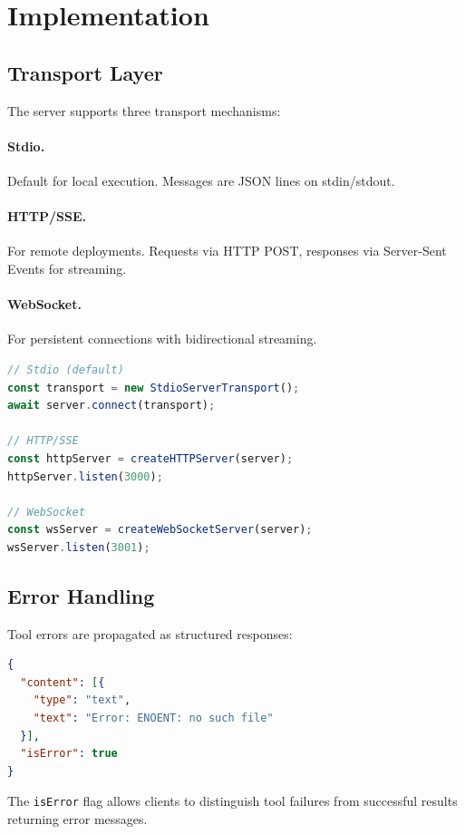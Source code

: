 \section{Implementation}


\subsection{Transport Layer}

The server supports three transport mechanisms:

\paragraph{Stdio.} Default for local execution. Messages are JSON lines on stdin/stdout.

\paragraph{HTTP/SSE.} For remote deployments. Requests via HTTP POST, responses via Server-Sent Events for streaming.

\paragraph{WebSocket.} For persistent connections with bidirectional streaming.

\begin{lstlisting}[language=TypeScript]
// Stdio (default)
const transport = new StdioServerTransport();
await server.connect(transport);

// HTTP/SSE
const httpServer = createHTTPServer(server);
httpServer.listen(3000);

// WebSocket
const wsServer = createWebSocketServer(server);
wsServer.listen(3001);
\end{lstlisting}

\subsection{Error Handling}

Tool errors are propagated as structured responses:

\begin{lstlisting}[language=JSON]
{
  "content": [{
    "type": "text",
    "text": "Error: ENOENT: no such file"
  }],
  "isError": true
}
\end{lstlisting}

The \texttt{isError} flag allows clients to distinguish tool failures from successful results returning error messages.

